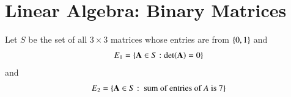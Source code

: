 \documentclass[journal,12pt,twocolumn]{IEEEtran}
\begin{document}
\section{Linear Algebra: Binary Matrices}
 Let $S$ be the set of all $3 \times 3$ matrices whose entries are from $\left\{0,1\right\}$ and
\begin{align}
E_1 = \left\{\mathbf{A}\in S: \det(\mathbf{A}) = 0\right\}
\end{align}
and 
\begin{align}
E_2 = \left\{\mathbf{A}\in S: \text{ sum of entries of $A$ is 7}\right\}
\end{align}
\end{document}
